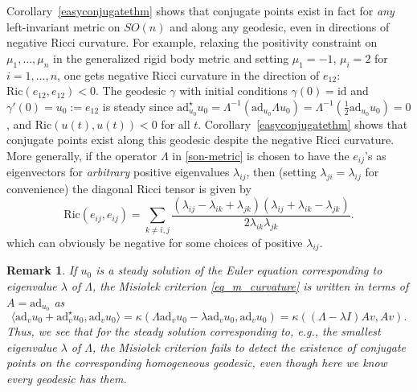 \documentclass[oneside, 11pt]{amsart}
\newtheorem{remark}[theorem]{Remark}
\numberwithin{equation}{section}
\newcommand{\ad}{\mathrm{ad}}
\newcommand{\adstar}{\ad^{\star}}
\newcommand{\id}{\mathrm{id}}
\newcommand{\bim}{\kappa}
\newcommand{\adop}{A}
\newcommand{\son}{e}
\begin{document}
Corollary~\ref{easyconjugatethm} shows that conjugate points exist in fact for \emph{any} left-invariant metric on $SO(n)$ and along any geodesic, even in directions of negative Ricci curvature. For example, relaxing the positivity constraint on $\mu_1,\hdots,\mu_n$ in the generalized rigid body metric and setting $\mu_1=-1$, $\mu_i=2$ for $i=1,\hdots,n$, one gets negative Ricci curvature in the direction of $\son_{12}$: $\mathrm{Ric}(\son_{12}, \son_{12})<0$. The geodesic $\gamma$ with initial conditions $\gamma(0)=\id$ and $\gamma'(0)=u_0:=\son_{12}$ is steady since $\adstar_{u_0}u_0=\Lambda^{-1}(\ad_{u_0}\Lambda u_0)=\Lambda^{-1}(\frac{1}{2}\ad_{u_0}u_0)=0$, and $\mathrm{Ric}(u(t), u(t))<0$ for all $t$. Corollary~\ref{easyconjugatethm} shows that conjugate points exist along this geodesic despite the negative Ricci curvature. More generally, if the operator $\Lambda$ in \eqref{son-metric} is chosen to have the $\son_{ij}$'s as eigenvectors for \emph{arbitrary} positive eigenvalues $\lambda_{ij}$, then (setting $\lambda_{ji}=\lambda_{ij}$ for convenience) the diagonal Ricci tensor is given by
$$\mathrm{Ric}(\son_{ij},\son_{ij})=\sum_{k\ne i,j} \frac{(\lambda_{ij}-\lambda_{ik}+\lambda_{jk})(\lambda_{ij}+\lambda_{ik}-\lambda_{jk})}{2\lambda_{ik}\lambda_{jk}}.$$
which can obviously be negative for some choices of positive $\lambda_{ij}$.

\begin{remark}\label{rem-Misiolek}
If $u_0$ is a steady solution of the Euler equation corresponding to eigenvalue $\lambda$ of $\Lambda$, the Misio{\l}ek criterion \eqref{eq_m_curvature} is written in terms of $\adop=\ad_{u_0}$ as  
$$\langle\ad_{v}u_0+\adstar_{v}u_0,\ad_vu_0\rangle=\bim(\Lambda\ad_{v}u_0-\lambda\ad_vu_0,\ad_vu_0)=\bim( (\Lambda -\lambda I)\adop v, \adop v).$$
Thus, we see that for the steady solution corresponding to, e.g., the smallest eigenvalue $\lambda$ of $\Lambda$, the Misio{\l}ek criterion fails to detect the existence of conjugate points on the corresponding homogeneous geodesic, even though here we know every geodesic has them.  
\end{remark}
\end{document}

